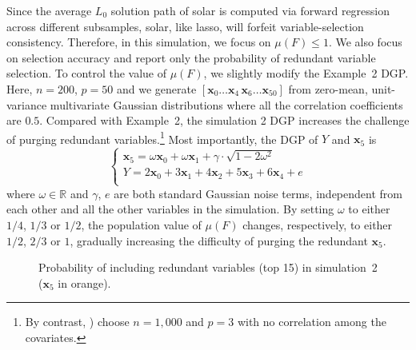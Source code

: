 \documentclass[12pt]{article}
\begin{document}
\noindent
Since the average $L_0$ solution path of solar is computed via forward regression across different subsamples, solar, like lasso, will forfeit variable-selection consistency. Therefore, in this simulation, we focus on $\mu \left( F \right) \leqslant 1$. We also focus on selection accuracy and report only the probability of redundant variable selection. To control the value of $\mu \left( F \right)$, we slightly modify the Example~2 DGP. Here, $n = 200$, $p = 50$ and we generate $[\mathbf{x}_0\ldots\mathbf{x}_4\,\mathbf{x}_6\ldots \mathbf{x}_{50}]$ from zero-mean, unit-variance multivariate Gaussian distributions where all the correlation coefficients are $0.5$. Compared with Example~2, the simulation 2 DGP increases the challenge of purging redundant variables.\footnote{By contrast, \citet{zhaoyu06}) choose $n = 1,000$ and $p =3$ with no correlation among the covariates.} Most importantly, the DGP of $Y$ and $\mathbf{x}_5$ is
\begin{equation}
	\begin{cases}
    \mathbf{x}_5 = \omega \mathbf{x}_0 + \omega \mathbf{x}_1 + \gamma\cdot \sqrt{1 - 2\omega^2} \\
    Y = 2 \mathbf{x}_0 + 3\mathbf{x}_1 + 4 \mathbf{x}_2 + 5 \mathbf{x}_3 + 6 \mathbf{x}_4 + e \\
	\end{cases}
	\label{eqn:dgp_x5}
\end{equation}
%
where $\omega \in \mathbb{R}$ and $\gamma$, $e$ are both standard Gaussian noise terms, independent from each other and all the other variables in the simulation. By setting $\omega$ to either $1/4$, $1/3$ or $1/2$, the population value of $\mu \left( F \right)$ changes, respectively, to either $1/2$, $2/3$ or $1$, gradually increasing the difficulty of purging the redundant $\mathbf{x}_5$.

\begin{figure}
  \centering

  \caption{Probability of including redundant variables (top 15) in simulation~2 ($\mathbf{x}_5$ in orange).}
  \label{fig:solar_ic_type-II}
\end{figure}
\end{document}
